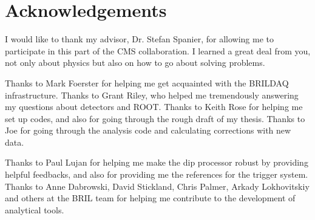 \chapter*{Acknowledgements}

\noindent
I would like to thank my advisor, Dr. Stefan Spanier, for allowing me to participate in this part of the CMS collaboration. I learned a great deal from you, not only about physics but also on how to go about solving problems.


\bigskip
\noindent
Thanks to Mark Foerster for helping me get acquainted with the BRILDAQ infrastructure. Thanks to Grant Riley, who helped me tremendously answering my questions about detectors and ROOT. Thanks to Keith Rose for helping me set up codes, and also for going through the rough draft of my thesis. Thanks to Joe for going through the analysis code and calculating corrections with new data. 


\bigskip
\noindent
Thanks to Paul Lujan for helping me make the dip processor robust by providing helpful feedbacks, and also for providing me the references for the trigger system. Thanks to Anne Dabrowski, David Stickland, Chris Palmer, Arkady Lokhovitskiy and others at the BRIL team for helping me contribute to the development of analytical tools.


